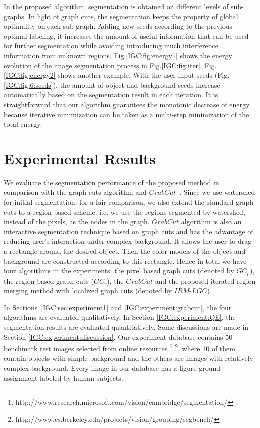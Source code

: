 In the proposed algorithm, segmentation is obtained on different levels of sub-graphs. In light of graph cuts, the segmentation keeps the property of global optimality on each sub-graph. Adding new seeds according to the previous optimal labeling, it increases the amount of useful information that can be used for further segmentation while avoiding introducing much interference information from unknown regions. Fig.\ref{IGC:fig:energy1} shows the energy evolution of the image segmentation process in Fig.\ref{IGC:fig:iter}. Fig.\ref{IGC:fig:energy2} shows another example. With the user input seeds (Fig.\ref{IGC:fig:6:seeds}), the amount of object and background seeds increase automatically based on the segmentation result in each iteration. It is straightforward that our algorithm guarantees the monotonic decrease of energy because iterative minimization can be taken as a multi-step minimization of the total energy.

\section{Experimental Results} \label{IGC:sec:4}
We evaluate the segmentation performance of the proposed method in comparison with the graph cuts algorithm \cite{Yuri01} and $GrabCut$~\cite{grabcut}. Since we use watershed for initial
segmentation, for a fair comparison, we also extend the standard graph cuts to a region based scheme, i.e. we use the regions segmented by watershed, instead of the pixels, as the nodes in the
graph. $GrabCut$ algorithm is also an interactive segmentation technique based on graph cuts and has the advantage of reducing user's interaction under complex background. It allows the user to drag a rectangle around the desired object. Then the color models of the object and background are constructed according to this rectangle. Hence in total we have four algorithms in the experiments: the pixel based graph cuts (denoted by $GC_p$), the region based graph cuts ($GC_r$), the $GrabCut$ and the proposed
iterated region merging method with localized graph cuts (denoted by $IRM$-$LGC$).

In Sections~\ref{IGC:sec:experiment1} and \ref{IGC:experiment:grabcut}, the four algorithms are evaluated qualitatively. In Section \ref{IGC:experiment:QE}, the segmentation results are evaluated quantitatively. Some discussions are made in Section \ref{IGC:experiment:discussion}. Our experiment database contains 50 benchmark test images selected from online resources
\footnote{http://www.research.microsoft.com/vision/cambridge/segmentation/}
\footnote{http://www.cs.berkeley.edu/projects/vision/grouping/segbench/},
 where 10 of them contain objects with simple background and the others are images with relatively complex background. Every image in our database has a figure-ground assignment labeled by human subjects.

